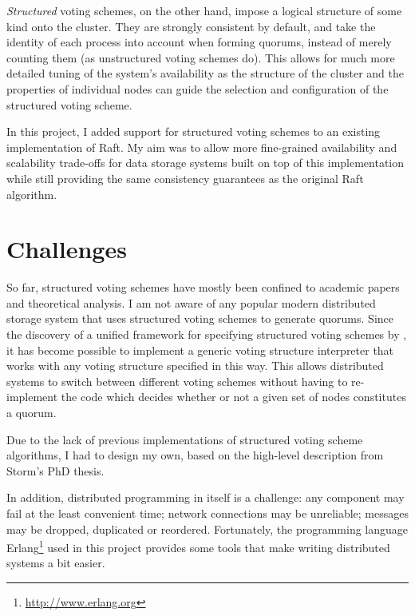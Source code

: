 \documentclass[12pt,chapterprefix=true,toc=bibliography,numbers=noendperiod,
               footnotes=multiple,twoside]{scrreprt}
\begin{document}
\emph{Structured} voting schemes, on the other hand, impose a logical structure of some kind onto the cluster. They are strongly consistent by default, and take the identity of each process into account when forming quorums, instead of merely counting them (as unstructured voting schemes do). This allows for much more detailed tuning of the system's availability as the structure of the cluster and the properties of individual nodes can guide the selection and configuration of the structured voting scheme.

In this project, I added support for structured voting schemes to an existing implementation of Raft. My aim was to allow more fine-grained availability and scalability trade-offs for data storage systems built on top of this implementation while still providing the same consistency guarantees as the original Raft algorithm.


\section{Challenges}
\label{sc:challenges}

So far, structured voting schemes have mostly been confined to academic papers and theoretical analysis. I am not aware of any popular modern distributed storage system that uses structured voting schemes to generate quorums. Since the discovery of a unified framework for specifying structured voting schemes by \citeauthor{generators},\autocite{generators} it has become possible to implement a generic voting structure interpreter that works with any voting structure specified in this way. This allows distributed systems to switch between different voting schemes without having to re-implement the code which decides whether or not a given set of nodes constitutes a quorum.

Due to the lack of previous implementations of structured voting scheme algorithms, I had to design my own, based on the high-level description from Storm's PhD thesis.\autocite{voting}

In addition, distributed programming in itself is a challenge: any component may fail at the least convenient time; network connections may be unreliable; messages may be dropped, duplicated or reordered. Fortunately, the programming language Erlang\footnote{\url{http://www.erlang.org}} used in this project provides some tools that make writing distributed systems a bit easier.
\end{document}
